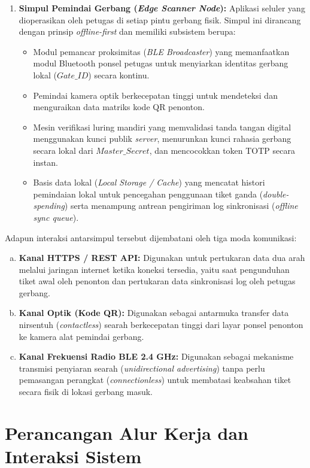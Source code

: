 \begin{enumerate}
    \item \textbf{Simpul Pemindai Gerbang (\textit{Edge Scanner Node}):}
    Aplikasi seluler yang dioperasikan oleh petugas di setiap pintu gerbang fisik. Simpul ini dirancang dengan prinsip \textit{offline-first} dan memiliki subsistem berupa:
    \begin{itemize}
        \item Modul pemancar proksimitas (\textit{BLE Broadcaster}) yang memanfaatkan modul Bluetooth ponsel petugas untuk menyiarkan identitas gerbang lokal ($Gate\_ID$) secara kontinu.
        \item Pemindai kamera optik berkecepatan tinggi untuk mendeteksi dan menguraikan data matriks kode QR penonton.
        \item Mesin verifikasi luring mandiri yang memvalidasi tanda tangan digital menggunakan kunci publik \textit{server}, menurunkan kunci rahasia gerbang secara lokal dari $Master\_Secret$, dan mencocokkan token TOTP secara instan.
        \item Basis data lokal (\textit{Local Storage / Cache}) yang mencatat histori pemindaian lokal untuk pencegahan penggunaan tiket ganda (\textit{double-spending}) serta menampung antrean pengiriman log sinkronisasi (\textit{offline sync queue}).
    \end{itemize}
\end{enumerate}

Adapun interaksi antarsimpul tersebut dijembatani oleh tiga moda komunikasi:
\begin{enumerate}[a)]
    \item \textbf{Kanal HTTPS / REST API:} Digunakan untuk pertukaran data dua arah melalui jaringan internet ketika koneksi tersedia, yaitu saat pengunduhan tiket awal oleh penonton dan pertukaran data sinkronisasi log oleh petugas gerbang.
    \item \textbf{Kanal Optik (Kode QR):} Digunakan sebagai antarmuka transfer data nirsentuh (\textit{contactless}) searah berkecepatan tinggi dari layar ponsel penonton ke kamera alat pemindai gerbang.
    \item \textbf{Kanal Frekuensi Radio BLE 2.4 GHz:} Digunakan sebagai mekanisme transmisi penyiaran searah (\textit{unidirectional advertising}) tanpa perlu pemasangan perangkat (\textit{connectionless}) untuk membatasi keabsahan tiket secara fisik di lokasi gerbang masuk.
\end{enumerate}

\section{Perancangan Alur Kerja dan Interaksi Sistem}
\label{sec:perancangan_alur}

